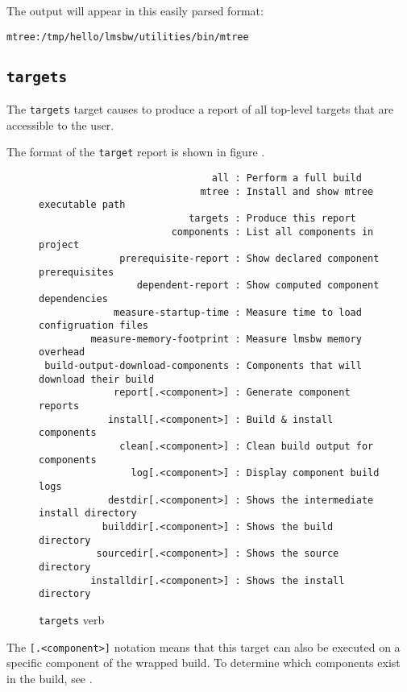 The output will appear in this easily parsed format:

\begin{verbatim}
mtree:/tmp/hello/lmsbw/utilities/bin/mtree
\end{verbatim}

\subsection{\texttt{targets}}

The \texttt{targets} target causes \lmsbw to produce a report of all
top-level targets that are accessible to the user.

The format of the \texttt{target} report is shown in figure
.

\begin{figure}[tbh]
\hrulefill
\begin{footnotesize}
\begin{verbatim}
                              all : Perform a full build
                            mtree : Install and show mtree executable path
                          targets : Produce this report
                       components : List all components in project
              prerequisite-report : Show declared component prerequisites
                 dependent-report : Show computed component dependencies
             measure-startup-time : Measure time to load configruation files
         measure-memory-footprint : Measure lmsbw memory overhead
 build-output-download-components : Components that will download their build
             report[.<component>] : Generate component reports
            install[.<component>] : Build & install components
              clean[.<component>] : Clean build output for components
                log[.<component>] : Display component build logs
            destdir[.<component>] : Shows the intermediate install directory
           builddir[.<component>] : Shows the build directory
          sourcedir[.<component>] : Shows the source directory
         installdir[.<component>] : Shows the install directory
\end{verbatim}
\end{footnotesize}
\hrulefill
\caption{\texttt{targets} verb}\label{usinglmsbw:targets-verb}
\end{figure}

The \texttt{[.<component>]} notation means that this target can also
be executed on a specific component of the wrapped build.  To
determine which components exist in the build, see
.


